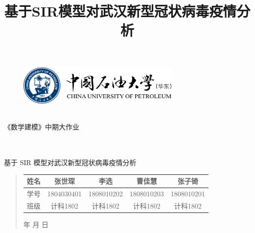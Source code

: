 \documentclass{article}
\title{基于SIR模型对武汉新型冠状病毒疫情分析}
\date{}
\renewcommand{\today}{\number\year 年 \number\month 月 \number\day 日}
\begin{document}
\begin{figure}
    \centering
    \includegraphics[width=8cm]{upc.png}
    \label{figupc}
\end{figure}
	\begin{center}
		\quad \\
		\heiti \fontsize{45}{17} \quad \quad \quad 
		\vskip 1cm
		\heiti {} 《数学建模》中期大作业
	\end{center}
  \begin{center}
    \quad \\
    \quad \\
    \heiti \fontsize{45}{17} \quad \quad \quad 
    \vskip 1cm
    \heiti {} 基于 SIR 模型对武汉新型冠状病毒疫情分析
    \vskip 2cm
  \end{center}

  \vskip 2cm
	\begin{quotation}
		\centering
    \begin{table}[H]
            \centering 
            \begin{tabular}{|c|c|c|c|c|}
            
                \hline
                姓名& 张世琛 &李选  & 曹佳慧 & 张子锜 \\
                \hline
                学号&1804030401&1808010202& 1808010203&1808010201\\
                \hline
                班级&计科1802&计科1802& 计科1802&计科1802\\
                
                \hline
            \end{tabular}
        \end{table}
		\centering
		\vskip 4cm
		\today
	\end{quotation}
\end{document}
